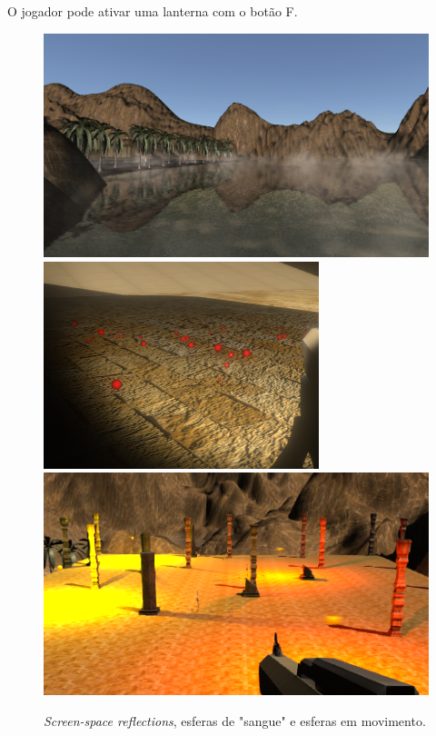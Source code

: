 \documentclass{article}
\begin{document}
        \par
        O jogador pode ativar uma lanterna com o botão F.
        \begin{figure}[h]\begin{center}
            \includegraphics[scale=0.2]{Screenshot_12.png}
            \includegraphics[scale=0.445]{Screenshot_19.png}
            \includegraphics[scale=0.38]{Screenshot_23.png}
            \caption{\textit{Screen-space reflections}, esferas de "sangue" e esferas em movimento.}
        \end{center}\end{figure}
\end{document}
